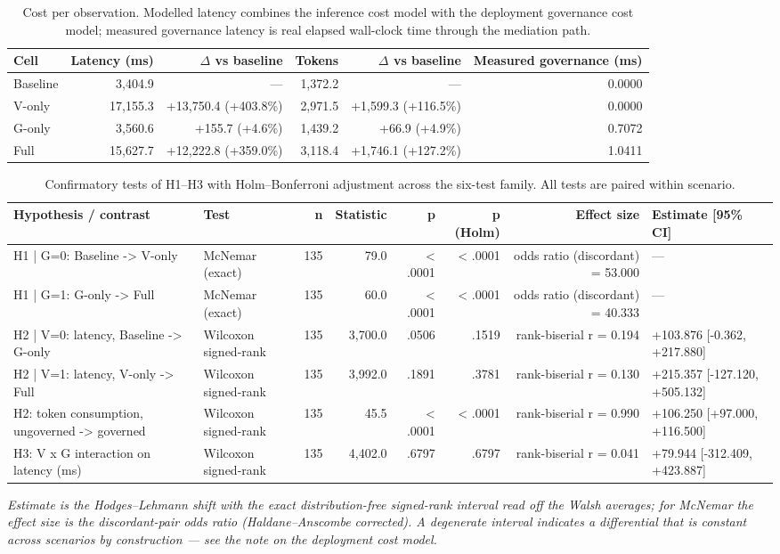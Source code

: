 \begin{table}[htbp]
\centering
\small
\caption{Cost per observation. Modelled latency combines the inference cost model with the deployment governance cost model; measured governance latency is real elapsed wall-clock time through the mediation path.}
\label{tab:gmais-3}
\begin{tabular}{lrrrrr}
\toprule
Cell & Latency (ms) & $\Delta$ vs baseline & Tokens & $\Delta$ vs baseline & Measured governance (ms) \\
\midrule
Baseline & 3,404.9 & --- & 1,372.2 & --- & 0.0000 \\
V-only & 17,155.3 & +13,750.4  (+403.8\%) & 2,971.5 & +1,599.3  (+116.5\%) & 0.0000 \\
G-only & 3,560.6 & +155.7  (+4.6\%) & 1,439.2 & +66.9  (+4.9\%) & 0.7072 \\
Full & 15,627.7 & +12,222.8  (+359.0\%) & 3,118.4 & +1,746.1  (+127.2\%) & 1.0411 \\
\bottomrule
\end{tabular}
\end{table}


\begin{table}[htbp]
\centering
\small
\caption{Confirmatory tests of H1–H3 with Holm–Bonferroni adjustment across the six-test family. All tests are paired within scenario.}
\label{tab:gmais-4}
\begin{tabular}{llrrrrrl}
\toprule
Hypothesis / contrast & Test & n & Statistic & p & p (Holm) & Effect size & Estimate [95\% CI] \\
\midrule
H1 | G=0: Baseline -> V-only & McNemar (exact) & 135 & 79.0 & < .0001 & < .0001 & odds ratio (discordant) = 53.000 & --- \\
H1 | G=1: G-only -> Full & McNemar (exact) & 135 & 60.0 & < .0001 & < .0001 & odds ratio (discordant) = 40.333 & --- \\
H2 | V=0: latency, Baseline -> G-only & Wilcoxon signed-rank & 135 & 3,700.0 & .0506 & .1519 & rank-biserial r = 0.194 & +103.876 [-0.362, +217.880] \\
H2 | V=1: latency, V-only -> Full & Wilcoxon signed-rank & 135 & 3,992.0 & .1891 & .3781 & rank-biserial r = 0.130 & +215.357 [-127.120, +505.132] \\
H2: token consumption, ungoverned -> governed & Wilcoxon signed-rank & 135 & 45.5 & < .0001 & < .0001 & rank-biserial r = 0.990 & +106.250 [+97.000, +116.500] \\
H3: V x G interaction on latency (ms) & Wilcoxon signed-rank & 135 & 4,402.0 & .6797 & .6797 & rank-biserial r = 0.041 & +79.944 [-312.409, +423.887] \\
\bottomrule
\end{tabular}
\par\vspace{2pt}\footnotesize\emph{Estimate is the Hodges–Lehmann shift with the exact distribution-free signed-rank interval read off the Walsh averages; for McNemar the effect size is the discordant-pair odds ratio (Haldane–Anscombe corrected). A degenerate interval indicates a differential that is constant across scenarios by construction --- see the note on the deployment cost model.}
\end{table}


